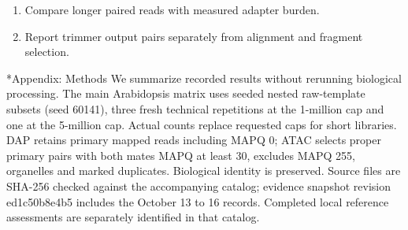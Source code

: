 \documentclass[10pt,letterpaper]{article}
\makeatletter
\renewcommand\section{\@startsection{section}{1}{\z@}{9pt}{4pt}{\large\bfseries}}
\makeatother
\begin{document}
\begin{enumerate}
\item Compare longer paired reads with measured adapter burden.
\item Report trimmer output pairs separately from alignment and fragment selection.
\end{enumerate}
\section*{Appendix: Methods}
We summarize recorded results without rerunning biological processing. The main Arabidopsis matrix uses seeded nested raw-template subsets (seed 60141), three fresh technical repetitions at the 1-million cap and one at the 5-million cap. Actual counts replace requested caps for short libraries. DAP retains primary mapped reads including MAPQ 0; ATAC selects proper primary pairs with both mates MAPQ at least 30, excludes MAPQ 255, organelles and marked duplicates. Biological identity is preserved. Source files are SHA-256 checked against the accompanying catalog; evidence snapshot revision ed1c50b8e4b5 includes the October 13 to 16 records. Completed local reference assessments are separately identified in that catalog.
\end{document}
